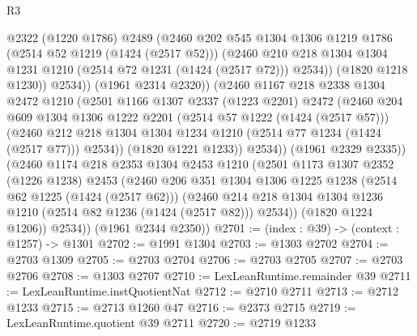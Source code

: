 \begin{lexlean}{R3}
\begin{coremodule}
                    @2322
                    (@1220 @1786)
                    @2489
                    (@2460
                      @202
                      @545
                      @1304
                      @1306
                      @1219
                      @1786
                      (@2514 @52 @1219 (@1424 (@2517 @52)))
                      (@2460
                        @210
                        @218
                        @1304
                        @1304
                        @1231
                        @1210
                        (@2514 @72 @1231 (@1424 (@2517 @72)))
                        @2534))
                    (@1820 @1218 @1230))
                  @2534))
              (@1961 @2314 @2320))
            (@2460
              @1167
              @218
              @2338
              @1304
              @2472
              @1210
              (@2501
                @1166
                @1307
                @2337
                (@1223 @2201)
                @2472
                (@2460
                  @204
                  @609
                  @1304
                  @1306
                  @1222
                  @2201
                  (@2514 @57 @1222 (@1424 (@2517 @57)))
                  (@2460
                    @212
                    @218
                    @1304
                    @1304
                    @1234
                    @1210
                    (@2514 @77 @1234 (@1424 (@2517 @77)))
                    @2534))
                (@1820 @1221 @1233))
              @2534))
          (@1961 @2329 @2335))
        (@2460
          @1174
          @218
          @2353
          @1304
          @2453
          @1210
          (@2501
            @1173
            @1307
            @2352
            (@1226 @1238)
            @2453
            (@2460
              @206
              @351
              @1304
              @1306
              @1225
              @1238
              (@2514 @62 @1225 (@1424 (@2517 @62)))
              (@2460 @214 @218 @1304 @1304 @1236 @1210 (@2514 @82 @1236 (@1424 (@2517 @82))) @2534))
            (@1820 @1224 @1206))
          @2534))
      (@1961 @2344 @2350))
@2701 := (index : @39) -> (context : @1257) -> @1301
@2702 := @1991 @1304
@2703 := @1303 @2702
@2704 := @2703 @1309
@2705 := @2703 @2704
@2706 := @2703 @2705
@2707 := @2703 @2706
@2708 := @1303 @2707
@2710 := LexLeanRuntime.remainder @39
@2711 := LexLeanRuntime.instQuotientNat
@2712 := @2710 @2711
@2713 := @2712 @1233
@2715 := @2713 @1260 @47
@2716 := @2373 @2715
@2719 := LexLeanRuntime.quotient @39 @2711
@2720 := @2719 @1233

\end{coremodule}
\end{lexlean}
